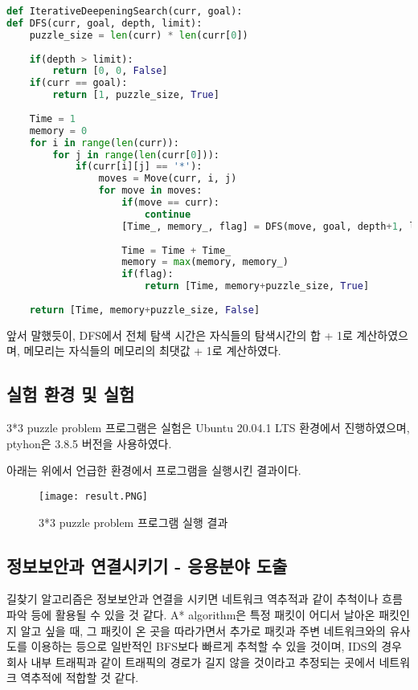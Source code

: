 \documentclass[manuscript,screen,review]{acmart}
\begin{document}
\begin{lstlisting}[language=python, caption=IterativeDeepeningSearch function] 
def IterativeDeepeningSearch(curr, goal):
def DFS(curr, goal, depth, limit):
    puzzle_size = len(curr) * len(curr[0])
    
    if(depth > limit):
        return [0, 0, False]
    if(curr == goal):
        return [1, puzzle_size, True]
    
    Time = 1
    memory = 0
    for i in range(len(curr)):
        for j in range(len(curr[0])):
            if(curr[i][j] == '*'):
                moves = Move(curr, i, j)
                for move in moves:
                    if(move == curr):
                        continue
                    [Time_, memory_, flag] = DFS(move, goal, depth+1, limit)
                    
                    Time = Time + Time_
                    memory = max(memory, memory_)
                    if(flag):
                        return [Time, memory+puzzle_size, True]
                    
    return [Time, memory+puzzle_size, False]
\end{lstlisting}

앞서 말했듯이, DFS에서 전체 탐색 시간은 자식들의 탐색시간의 합 + 1로 계산하였으며, 메모리는 자식들의 메모리의 최댓값 + 1로 계산하였다.

\subsection{실험 환경 및 실험}

3*3 puzzle problem 프로그램은 실험은 Ubuntu 20.04.1 LTS 환경에서 진행하였으며, ptyhon은 3.8.5 버전을 사용하였다.

아래는 위에서 언급한 환경에서 프로그램을 실행시킨 결과이다.

\begin{figure}[h] %
\begin{center}
\texttt{[image: result.PNG]}
\end{center}
\caption{3*3 puzzle problem 프로그램 실행 결과}
\label{fig:long}
\label{fig:onecol}
\end{figure}

\subsection{정보보안과 연결시키기 - 응용분야 도출}

길찾기 알고리즘은 정보보안과 연결을 시키면 네트워크 역추적과 같이 추척이나 흐름 파악 등에 활용될 수 있을 것 같다. A* algorithm은 특정 패킷이 어디서 날아온 패킷인지 알고 싶을 때, 그 패킷이 온 곳을 따라가면서 추가로 패킷과 주변 네트워크와의 유사도를 이용하는 등으로 일반적인 BFS보다 빠르게 추척할 수 있을 것이며, IDS의 경우 회사 내부 트래픽과 같이 트래픽의 경로가 길지 않을 것이라고 추정되는 곳에서 네트워크 역추적에 적합할 것 같다.
\end{document}
